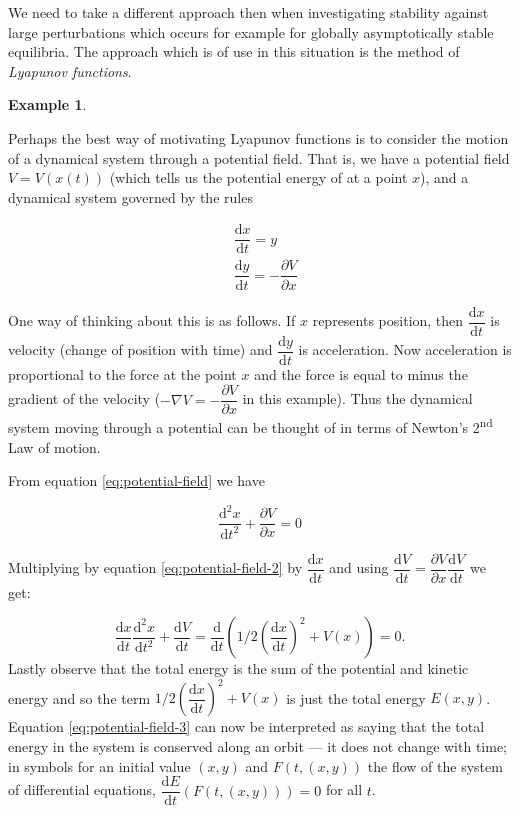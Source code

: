 \documentclass[
  a4paper,
  oneside,
  final]{krantz}
\renewcommand{\d}{\mathrm{d}}
\newcommand{\pder}[2]{\dfrac{\partial #1}{\partial#2}}
\newcommand{\der}[2]{\dfrac{\d #1}{\d #2}}
\newcommand{\dern}[3]{\dfrac{\d^{#3} #1}{\d #2 ^{#3}}}
\theoremstyle{definition}
\theoremstyle{definition}
\newtheorem{example}{Example}[chapter]
\theoremstyle{definition}
\theoremstyle{definition}
\theoremstyle{remark}
\begin{document}
We need to take a different approach then when investigating stability against large perturbations which occurs for example for globally asymptotically stable equilibria. The approach which is of use in this situation is the method of \emph{Lyapunov functions}.

\begin{example}
\protect\hypertarget{exm:lyapunov-motivation}{}\label{exm:lyapunov-motivation}

Perhaps the best way of motivating Lyapunov functions is to consider the motion of a dynamical system through a potential field. That is, we have a potential field \(V = V(x(t))\) (which tells us the potential energy of at a point \(x\)), and a dynamical system governed by the rules

\begin{align}
    &\der{x}{t} =  y \\
    &\der{y}{t} = - \pder{V}{x}
    \label{eq:potential-field}
\end{align}

One way of thinking about this is as follows. If \(x\) represents position, then \(\der{x}{t}\) is velocity (change of position with time) and \(\der{y}{t}\) is acceleration. Now acceleration is proportional to the force at the point \(x\) and the force is equal to minus the gradient of the velocity (\(-\nabla{V} = -\pder{V}{x}\) in this example). Thus the dynamical system moving through a potential can be thought of in terms of Newton's 2\textsuperscript{nd} Law of motion.

From equation \eqref{eq:potential-field} we have

\begin{equation}
 \dern{x}{t}{2} + \pder{V}{x} = 0
 \label{eq:potential-field-2}
\end{equation}

Multiplying by equation \eqref{eq:potential-field-2} by \(\der{x}{t}\) and using \(\der{V}{t} = \pder{V}{x} \der{V}{t}\) we get:

\begin{equation}
 \der{x}{t}\dern{x}{t}{2} + \der{V}{t} = \der{}{t}\left(1/2 \left(\der{x}{t}\right)^2 + V(x)\right) = 0.
\label{eq:potential-field-3}
\end{equation}
Lastly observe that the total energy is the sum of the potential and kinetic energy and so the term \(1/2 \left(\der{x}{t}\right)^2 + V(x)\) is just the total energy \(E(x,y)\). Equation \eqref{eq:potential-field-3} can now be interpreted as saying that the total energy in the system is conserved along an orbit --- it does not change with time; in symbols for an initial value \((x,y)\) and \(F(t, (x,y))\) the flow of the system of differential equations, \(\der{E}{t}(F(t, (x,y))) = 0\) for all \(t\).


\end{example}
\end{document}
